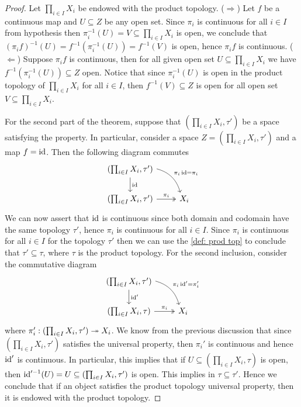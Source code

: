 \begin{proof}
    Let \(\prod_{i \in I} X_i\) be endowed with the product topology.
    (\(\Rightarrow\)) Let \(f\) be a continuous map and \(U \subseteq Z\) be any
    open set. Since \(\pi_i\) is continuous for all \(i \in I\) from hypothesis
    then \(\pi_i^{-1}(U) = V \subseteq \prod_{i \in I} X_i\) is open, we conclude
    that \((\pi_i  f)^{-1}(U) = f^{-1}(\pi_i^{-1}(U)) = f^{-1}(V)\) is open,
    hence \(\pi_i  f\) is continuous. (\(\Leftarrow\)) Suppose \(\pi_i
    f\) is continuous, then for all given open set \(U \subseteq \prod_{i \in I}
    X_i\) we have \(f^{-1}(\pi_i^{-1}(U)) \subseteq Z\) open. Notice that since
    \(\pi_i^{-1}(U)\) is open in the product topology of \(\prod_{i \in I} X_i\)
    for all \(i \in I\), then \(f^{-1}(V) \subseteq Z\) is open for all open set
    \(V \subseteq \prod_{i \in I} X_i\).

    For the second part of the theorem, suppose that \((\prod_{i \in I} X_i,
    \tau')\) be a space satisfying the property. In particular, consider a
    space \(Z = (\prod_{i \in I} X_i, \tau')\) and a map \(f = \operatorname{id}\). Then
    the following diagram commutes
    \[
        \begin{tikzcd}
            (\prod_{i \in I} X_i, \tau')
            \ar[d, "\Id"]
            \ar[dr, bend left, "\pi_i  \Id = \pi_i"] \\
            (\prod_{i \in I} X_i, \tau')
            \ar[r, two heads, "\pi_i"]
            &X_i
        \end{tikzcd}
    \]
    We can now assert that \(\operatorname{id}\) is continuous since both domain and codomain
    have the same topology \(\tau'\), hence \(\pi_i\) is continuous for all
    \(i \in I\). Since \(\pi_i\) is continuous for all \(i \in I\) for the
    topology \(\tau'\) then we can use the \cref{def: prod top} to conclude
    that \(\tau' \subseteq \tau\), where \(\tau\) is the product
    topology. For the second inclusion, consider the commutative diagram
    \[
        \begin{tikzcd}
            (\prod_{i \in I} X_i, \tau')
            \ar[d, "\Id'"]
            \ar[dr, bend left, "\pi_i  \Id' = \pi_i'"] \\
            (\prod_{i \in I} X_i, \tau)
            \ar[r, two heads, "\pi_i"]
            &X_i
        \end{tikzcd}
    \]
    where \(\pi_i': (\prod_{i \in I} X_i, \tau') \twoheadrightarrow X_i\). We know from
    the previous discussion that since \((\prod_{i \in I} X_i, \tau')\)
    satisfies the universal property, then \(\pi_i'\) is continuous and hence
    \(\operatorname{id}'\) is continuous. In particular, this implies that if  \(U \subseteq
    (\prod_{i \in I} X_i, \tau)\) is open, then \(\operatorname{id}'^{-1}(U) = U
    \subseteq (\prod_{i \in I} X_i, \tau')\) is open. This implies in
    \(\tau \subseteq \tau'\). Hence we conclude that if an object
    satisfies the product topology universal property, then it is endowed with the
    product topology.
\end{proof}

